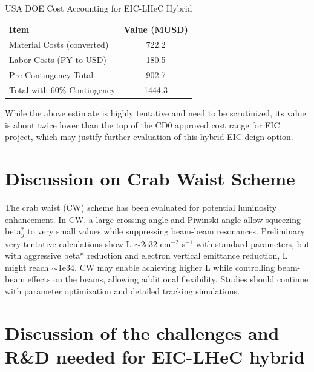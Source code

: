 \documentclass{article}
\begin{document}
\begin{longtable}{lc}
\caption{USA DOE Cost Accounting for EIC-LHeC Hybrid} \\
\toprule
Item & Value (MUSD) \\
\midrule
Material Costs (converted) & 722.2 \\
Labor Costs (PY to USD) & 180.5 \\
Pre-Contingency Total & 902.7 \\
Total with 60\% Contingency & 1444.3 \\
\bottomrule
\end{longtable}

While the above estimate is highly tentative and need to be scrutinized, its value is about twice lower than the top of the CD0 approved cost range for EIC project, which may justify further evaluation of this hybrid EIC deign option. 

\section{Discussion on Crab Waist Scheme}

The crab waist (CW) scheme has been evaluated for potential luminosity enhancement. In CW, a large crossing angle and Piwinski angle allow squeezing beta$_y^*$ to very small values while suppressing beam-beam resonances. Preliminary very tentative calculations show L $\sim$2e32 cm$^{-2}$ s$^{-1}$ with standard parameters, but with aggressive beta* reduction and electron vertical emittance reduction, L might reach $\sim$1e34. CW may enable achieving higher L while controlling beam-beam effects on the beams, allowing additional flexibility. Studies should continue with parameter optimization and detailed tracking simulations.

\section{Discussion of the challenges and R\&D needed for EIC-LHeC hybrid}
\end{document}
